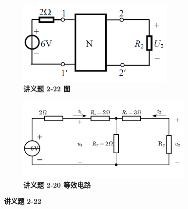\documentclass[UTF8]{report}
\theoremstyle{MyLineTheoremStyle} %
\theoremstyle{MyBlockTheoremStyle} %
\theoremstyle{MySubsubsectionStyle} %
\begin{document}
\begin{figure}[H]\centering
\begin{subfigure}[t]{0.5\columnwidth}\centering
    \includegraphics[height=120pt]{assets/4/199279d29390a5449f7ef5c5dc7f8a3d.png}
    \caption{\bfseries 讲义题 2-22 图 }
\end{subfigure}\begin{subfigure}[t]{0.5\columnwidth}\centering
    \includegraphics[height=120pt]{assets/4/bd23c61fd9d5ec13d9ce56376fe64d2c.png}
    \caption{\bfseries 讲义题 2-20 等效电路 }
\end{subfigure}
\caption{\bfseries 讲义题 2-22 }
\end{figure}
\end{document}
